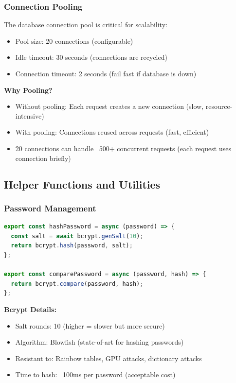 \documentclass[12pt,a4paper,oneside]{article}
\begin{document}
\subsubsection{Connection Pooling}

The database connection pool is critical for scalability:

\begin{itemize}
    \item Pool size: 20 connections (configurable)
    \item Idle timeout: 30 seconds (connections are recycled)
    \item Connection timeout: 2 seconds (fail fast if database is down)
\end{itemize}

\textbf{Why Pooling?}

\begin{itemize}
    \item Without pooling: Each request creates a new connection (slow, resource-intensive)
    \item With pooling: Connections reused across requests (fast, efficient)
    \item 20 connections can handle ~500+ concurrent requests (each request uses connection briefly)
\end{itemize}

\subsection{Helper Functions and Utilities}

\subsubsection{Password Management}

\begin{lstlisting}[language=JavaScript, caption=Password Hashing and Verification]
export const hashPassword = async (password) => {
  const salt = await bcrypt.genSalt(10);
  return bcrypt.hash(password, salt);
};

export const comparePassword = async (password, hash) => {
  return bcrypt.compare(password, hash);
};
\end{lstlisting}

\textbf{Bcrypt Details:}

\begin{itemize}
    \item Salt rounds: 10 (higher = slower but more secure)
    \item Algorithm: Blowfish (state-of-art for hashing passwords)
    \item Resistant to: Rainbow tables, GPU attacks, dictionary attacks
    \item Time to hash: ~100ms per password (acceptable cost)
\end{itemize}
\end{document}
